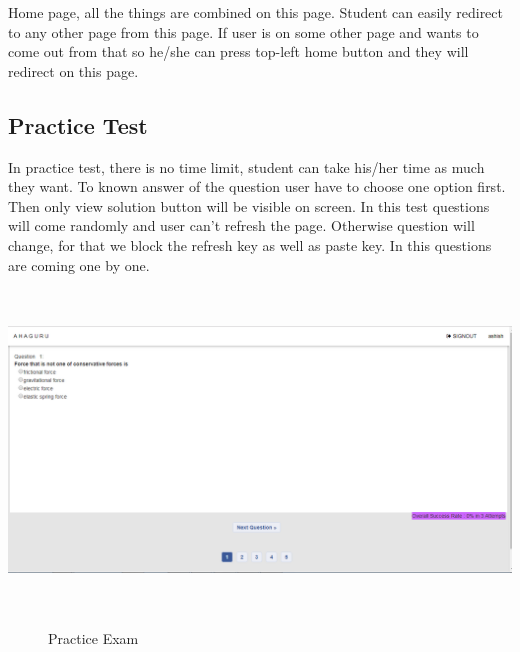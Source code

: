 Home page, all the things are combined on this page. Student can easily redirect to any other page from this page.  If user is on some other page and wants to come out from that so he/she can press top-left home button and they will redirect on this page.

\break
\subsection{Practice Test}
In practice test, there is no time limit, student can take his/her time as much they want. To known answer of the question user have to choose one option first. Then only view solution button will be visible on screen. In this test questions will come randomly and user can't refresh the page. Otherwise question will change, for that we block the refresh key as well as paste key. In this questions are coming one by one.
\begin{center}
	\includegraphics[width=13.5cm, height=8.5cm]{practice_exam.png}
	\begin{figure}[h!]
		\centering
		\caption{Practice Exam}%
	\end{figure}
\end{center} \break
